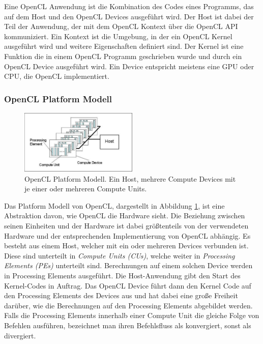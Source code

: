 Eine OpenCL Anwendung ist die Kombination des Codes eines Programms, das auf dem Host und den OpenCL Devices ausgeführt wird.
Der Host ist dabei der Teil der Anwendung, der mit dem OpenCL Kontext über die OpenCL API kommuniziert.
Ein Kontext ist die Umgebung, in der ein OpenCL Kernel ausgeführt wird und weitere Eigenschaften definiert sind.
Der Kernel ist eine Funktion die in einem OpenCL Programm geschrieben wurde und durch ein OpenCL Device ausgeführt wird.
Ein Device entspricht meistens eine GPU oder CPU, die OpenCL implementiert. %

\subsubsection*{OpenCL Platform Modell}
\begin{figure}
	\centering
	\includegraphics[width=0.5\textwidth]{../../Grafiken/OpenCL_PlatformModel.png}
	\caption{OpenCL Platform Modell. Ein Host, mehrere Compute Devices mit je einer oder mehreren Compute Units. \cite{OCLSPC}}
	\label{fig::ga02}
\end{figure}
Das Platform Modell von OpenCL, dargestellt in Abbildung \ref{fig::ga02}, ist eine Abstraktion davon, wie OpenCL die Hardware sieht.
Die Beziehung zwischen seinen Einheiten und der Hardware ist dabei größtenteils von der verwendeten Hardware und der entsprechenden Implementierung von OpenCL abhängig.
Es besteht aus einem Host, welcher mit ein oder mehreren Devices verbunden ist.
Diese sind unterteilt in \emph{Compute Units (CUs)}, welche weiter in \emph{Processing Elements (PEs)} unterteilt sind.
Berechnungen auf einem solchen Device werden in Processing Elements ausgeführt.
Die Host-Anwendung gibt den Start des Kernel-Codes in Auftrag.
Das OpenCL Device führt dann den Kernel Code auf den Processing Elements des Devices aus und hat dabei eine große Freiheit darüber, wie die Berechnungen auf den Processing Elements abgebildet werden.
Falls die Processing Elements innerhalb einer Compute Unit die gleiche Folge von Befehlen ausführen, bezeichnet man ihren Befehlsfluss als konvergiert, sonst als divergiert.

